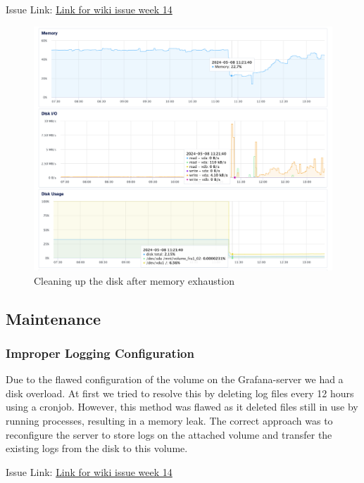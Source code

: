 Issue Link: \href{https://github.com/DevopsGroupC/Minitwit/wiki/Week-14}{\color{blue}Link for wiki issue week 14}


\begin{figure}[H]
\centering
\includegraphics[height=0.9\textwidth]{images/CleanUpMemoryLeakGrafanaServer.png}
\caption{Cleaning up the disk after memory exhaustion}
\label{fig:grafana-memoryleak}
\end{figure}


\subsection{Maintenance}
\subsubsection{Improper Logging Configuration}
Due to the flawed configuration of the volume on the Grafana-server we had a disk overload. At first we tried to resolve this by deleting log files every 12 hours using a cronjob. However, this method was flawed as it deleted files still in use by running processes, resulting in a memory leak. The correct approach was to reconfigure the server to store logs on the attached volume and transfer the existing logs from the disk to this volume.

Issue Link: \href{https://github.com/DevopsGroupC/Minitwit/wiki/Week-14}{\color{blue}Link for wiki issue week 14}

